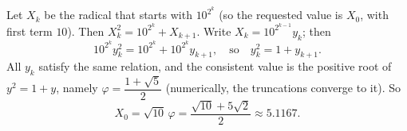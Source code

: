 Let $X_k$ be the radical that starts with $10^{2^k}$ (so the requested value is $X_0$, with first term $10$). Then $X_k^2=10^{2^k}+X_{k+1}$. Write $X_k=10^{2^{k-1}}y_k$; then
\[10^{2^k}y_k^2=10^{2^k}+10^{2^k}y_{k+1},\quad\text{so}\quad y_k^2=1+y_{k+1}.\]
All $y_k$ satisfy the same relation, and the consistent value is the positive root of $y^2=1+y$, namely $\varphi=\dfrac{1+\sqrt5}2$ (numerically, the truncations converge to it). So
\[X_0=\sqrt{10}\,\varphi=\boxed{\dfrac{\sqrt{10}+5\sqrt2}2}\approx5.1167.\]
